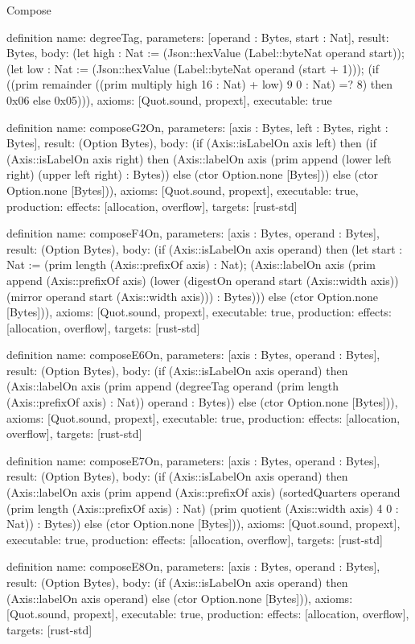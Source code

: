 \begin{lexlean}{Compose}
\begin{semanticmodule}
definition{
  name: degreeTag,
  parameters: [operand : Bytes, start : Nat],
  result: Bytes,
  body: (let high : Nat := (Json::hexValue (Label::byteNat operand start)); (let low : Nat := (Json::hexValue (Label::byteNat operand (start + 1))); (if ((prim remainder ((prim multiply high 16 : Nat) + low) 9 0 : Nat) =? 8) then 0x06 else 0x05))),
  axioms: [Quot.sound, propext],
  executable: true
}

definition{
  name: composeG2On,
  parameters: [axis : Bytes, left : Bytes, right : Bytes],
  result: (Option Bytes),
  body: (if (Axis::isLabelOn axis left) then (if (Axis::isLabelOn axis right) then (Axis::labelOn axis (prim append (lower left right) (upper left right) : Bytes)) else (ctor Option.none [Bytes])) else (ctor Option.none [Bytes])),
  axioms: [Quot.sound, propext],
  executable: true,
  production: {effects: [allocation, overflow], targets: [rust-std]}
}

definition{
  name: composeF4On,
  parameters: [axis : Bytes, operand : Bytes],
  result: (Option Bytes),
  body: (if (Axis::isLabelOn axis operand) then (let start : Nat := (prim length (Axis::prefixOf axis) : Nat); (Axis::labelOn axis (prim append (Axis::prefixOf axis) (lower (digestOn operand start (Axis::width axis)) (mirror operand start (Axis::width axis))) : Bytes))) else (ctor Option.none [Bytes])),
  axioms: [Quot.sound, propext],
  executable: true,
  production: {effects: [allocation, overflow], targets: [rust-std]}
}

definition{
  name: composeE6On,
  parameters: [axis : Bytes, operand : Bytes],
  result: (Option Bytes),
  body: (if (Axis::isLabelOn axis operand) then (Axis::labelOn axis (prim append (degreeTag operand (prim length (Axis::prefixOf axis) : Nat)) operand : Bytes)) else (ctor Option.none [Bytes])),
  axioms: [Quot.sound, propext],
  executable: true,
  production: {effects: [allocation, overflow], targets: [rust-std]}
}

definition{
  name: composeE7On,
  parameters: [axis : Bytes, operand : Bytes],
  result: (Option Bytes),
  body: (if (Axis::isLabelOn axis operand) then (Axis::labelOn axis (prim append (Axis::prefixOf axis) (sortedQuarters operand (prim length (Axis::prefixOf axis) : Nat) (prim quotient (Axis::width axis) 4 0 : Nat)) : Bytes)) else (ctor Option.none [Bytes])),
  axioms: [Quot.sound, propext],
  executable: true,
  production: {effects: [allocation, overflow], targets: [rust-std]}
}

definition{
  name: composeE8On,
  parameters: [axis : Bytes, operand : Bytes],
  result: (Option Bytes),
  body: (if (Axis::isLabelOn axis operand) then (Axis::labelOn axis operand) else (ctor Option.none [Bytes])),
  axioms: [Quot.sound, propext],
  executable: true,
  production: {effects: [allocation, overflow], targets: [rust-std]}
}


\end{semanticmodule}
\end{lexlean}
